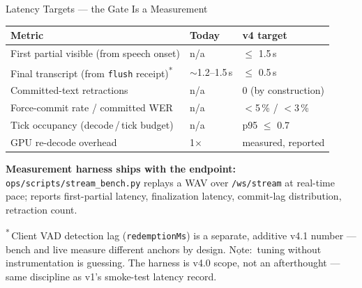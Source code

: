 \documentclass{beamer}
\newcommand{\nt}{$\underline{\text{Note}}:$ }
\begin{document}
\begin{frame}{Latency Targets --- the Gate Is a Measurement}
    \begin{table}
    \centering\footnotesize
    \begin{tabular}{@{} l l l @{}}
        \toprule
        \textbf{Metric} & \textbf{Today} & \textbf{v4 target} \\
        \midrule
        First partial visible (from speech onset) & n/a & $\leq$ 1.5\,s \\
        Final transcript (from \texttt{flush} receipt)\textsuperscript{*} & $\sim$1.2--1.5\,s & $\leq$ 0.5\,s \\
        Committed-text retractions & n/a & 0 (by construction) \\
        Force-commit rate / committed WER & n/a & $<$5\,\% / $<$3\,\% \\
        Tick occupancy (decode\,/\,tick budget) & n/a & p95 $\leq$ 0.7 \\
        GPU re-decode overhead & 1$\times$ & measured, reported \\
        \bottomrule
    \end{tabular}
    \end{table}

    \vspace{0.5em}
    \footnotesize
    \textbf{Measurement harness ships with the endpoint:}\\
    \texttt{ops/scripts/stream\_bench.py} replays a WAV over \texttt{/ws/stream}
    at real-time pace; reports first-partial latency, finalization latency,
    commit-lag distribution, retraction count.

    \vspace{0.3em}
    \scriptsize
    \textsuperscript{*}\,Client VAD detection lag (\texttt{redemptionMs}) is a separate,
    additive v4.1 number --- bench and live measure different anchors by design.
    \nt tuning without instrumentation is guessing. The harness is v4.0 scope,
    not an afterthought --- same discipline as v1's smoke-test latency record.
\end{frame}
\end{document}
